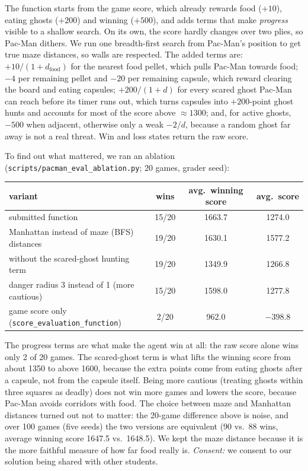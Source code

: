 \begin{solution}
The function starts from the game score, which already rewards food ($+10$), eating ghosts ($+200$) and
winning ($+500$), and adds terms that make \emph{progress} visible to a shallow search. On its own, the score
hardly changes over two plies, so Pac-Man dithers. We run one breadth-first search from Pac-Man's position to get
true maze distances, so walls are respected. The added terms are: $+10/(1+d_{\text{food}})$ for the nearest food
pellet, which pulls Pac-Man towards food; $-4$ per remaining pellet and $-20$ per remaining capsule, which reward
clearing the board and eating capsules; $+200/(1+d)$ for every scared ghost Pac-Man can reach before its timer
runs out, which turns capsules into $+200$-point ghost hunts and accounts for most of the score above
$\approx1300$; and, for active ghosts, $-500$ when adjacent, otherwise only a weak $-2/d$, because a random ghost
far away is not a real threat. Win and loss states return the raw score.

To find out what mattered, we ran an ablation (\texttt{scripts/pacman\_eval\_ablation.py}; 20 games,
grader seed):
\begin{center}\small
\begin{tabular}{lccc}
\toprule
variant & wins & avg.\ winning score & avg.\ score \\
\midrule
submitted function & 15/20 & 1663.7 & 1274.0 \\
Manhattan instead of maze (BFS) distances & 19/20 & 1630.1 & 1577.2 \\
without the scared-ghost hunting term & 19/20 & 1349.9 & 1266.8 \\
danger radius 3 instead of 1 (more cautious) & 15/20 & 1598.0 & 1277.8 \\
game score only (\texttt{score\_evaluation\_function}) & 2/20 & 962.0 & $-398.8$ \\
\bottomrule
\end{tabular}
\end{center}
The progress terms are what make the agent win at all: the raw score alone wins only 2 of 20 games. The
scared-ghost term is what lifts the winning score from about 1350 to above 1600, because the extra points come from
eating ghosts after a capsule, not from the capsule itself. Being more cautious (treating ghosts within three
squares as deadly) does not win more games and lowers the score, because Pac-Man avoids corridors with food. The
choice between maze and Manhattan distances turned out not to matter: the 20-game difference above is noise, and
over 100 games (five seeds) the two versions are equivalent (90 vs.\ 88 wins, average winning score 1647.5 vs.\
1648.5). We kept the maze distance because it is the more faithful measure of how far food really is.
\textit{Consent:} we consent to our solution being shared with other students.
\end{solution}

